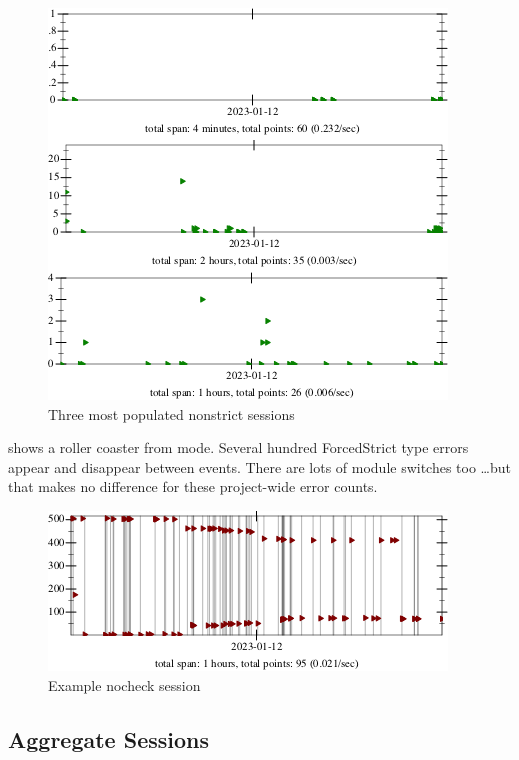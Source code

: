 \documentclass[english,submission,cleveref]{programming}
\begin{document}
\begin{figure}[t]
  \includegraphics[width=0.7\columnwidth]{img/example-session-nonstrict.pdf}
  \caption{Three most populated nonstrict sessions}
  \label{f:ex-session-nonstrict}
\end{figure}

 shows a roller coaster from \mnocheck{} mode.
Several hundred ForcedStrict type errors appear and disappear between events.
There are lots of module switches too \ldots but that makes no difference
for these project-wide error counts.

\begin{figure}[t]
  \includegraphics[width=0.7\columnwidth]{img/example-session-nocheck.pdf}
  \caption{Example nocheck session}
  \label{f:ex-session-nocheck}
\end{figure}


\subsection{Aggregate Sessions}
\end{document}

